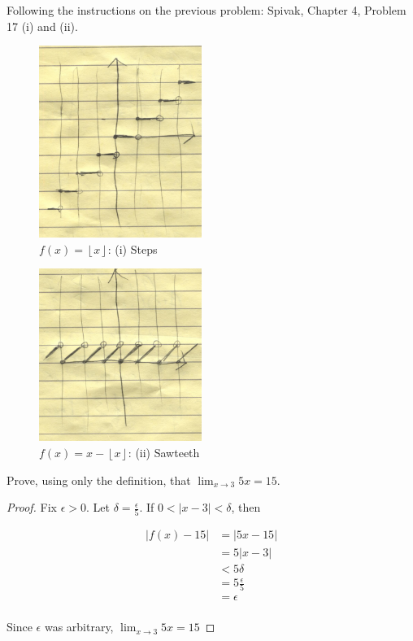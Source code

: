 \documentclass{article} %
\theoremstyle{plain}
\theoremstyle{definition}
\begin{document}
\vspace*{12pt}  %

\noindent{} Following the instructions on the previous problem: Spivak, Chapter 4, Problem 17 (i) and (ii). 

\begin{figure}[H]
    \includegraphics[width=200px]{steps.png}
    \caption{$f(x) = \left \lfloor {x} \right \rfloor$: (i) Steps}
\end{figure}
\begin{figure}[H]
    \includegraphics[width=200px]{sawteeth.png}
    \caption{$f(x) = x - \left \lfloor {x} \right \rfloor$: (ii) Sawteeth}
\end{figure}

\vspace*{12pt}  %


\noindent{} Prove, using only the definition, that $\lim_{x \rightarrow 3} 5x = 15$. 

\begin{proof} 
    Fix $\epsilon > 0$.  Let $\delta = \frac{\epsilon}{5}$. If $0 < |x-3| < \delta$, then

    \begin{align*}
        |f(x) - 15| &= |5x - 15| \\
                    &= 5|x-3| \\
                    &< 5 \delta \\
                    &= 5 \frac{\epsilon}{5} \\
                    &= \epsilon \\
    \end{align*}

    Since $\epsilon$ was arbitrary, $\lim_{x \rightarrow 3} 5x = 15$
\end{proof} 
\end{document}
